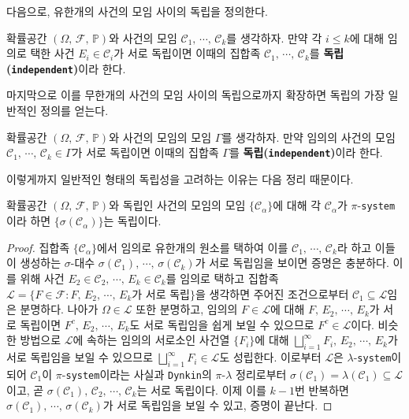 다음으로, 유한개의 사건의 모임 사이의 독립을 정의한다.

\begin{definition}
    확률공간 $(\Omega,\,\mathcal{F},\,\mathbb{P})$와 사건의 모임 $\mathcal{C}_1,\,\cdots,\,\mathcal{C}_k$를 생각하자. 만약 각 $i\leq k$에 대해 임의로 택한 사건 $E_i\in\mathcal{C}_i$가 서로 독립이면 이때의 집합족 $\mathcal{C}_1,\,\cdots,\,\mathcal{C}_k$를 \textbf{독립(\texttt{independent})}이라 한다.
\end{definition}

마지막으로 이를 무한개의 사건의 모임 사이의 독립으로까지 확장하면 독립의 가장 일반적인 정의를 얻는다.

\begin{definition}
    확률공간 $(\Omega,\,\mathcal{F},\,\mathbb{P})$와 사건의 모임의 모임 $\Gamma$를 생각하자. 만약 임의의 사건의 모임 $\mathcal{C}_1,\,\cdots,\,\mathcal{C}_k\in\Gamma$가 서로 독립이면 이때의 집합족 $\Gamma$를 \textbf{독립(\texttt{independent})}이라 한다.
\end{definition}

이렇게까지 일반적인 형태의 독립성을 고려하는 이유는 다음 정리 때문이다.

\begin{theorem}
    확률공간 $(\Omega,\,\mathcal{F},\,\mathbb{P})$와 독립인 사건의 모임의 모임 $\{\mathcal{C}_\alpha\}$에 대해 각 $\mathcal{C}_\alpha$가 $\pi$-\texttt{system}이라 하면 $\{\sigma(\mathcal{C}_\alpha)\}$는 독립이다.
\end{theorem}

\begin{proof}
    집합족 $\{\mathcal{C}_\alpha\}$에서 임의로 유한개의 원소를 택하여 이를 $\mathcal{C}_1,\,\cdots,\,\mathcal{C}_k$라 하고 이들이 생성하는 $\sigma$-대수 $\sigma(\mathcal{C}_1),\,\cdots,\,\sigma(\mathcal{C}_k)$가 서로 독립임을 보이면 증명은 충분하다. 이를 위해 사건 $E_2\in\mathcal{C}_2,\,\cdots,\,E_k\in\mathcal{C}_k$를 임의로 택하고 집합족 $\mathcal{L}=\{F\in\mathcal{F}:F,\,E_2,\,\cdots,\,E_k\textrm{가 서로 독립}\}$을 생각하면 주어진 조건으로부터 $\mathcal{C}_1\subseteq\mathcal{L}$임은 분명하다. 나아가 $\Omega\in\mathcal{L}$ 또한 분명하고, 임의의 $F\in\mathcal{L}$에 대해 $F,\,E_2,\,\cdots,\,E_k$가 서로 독립이면 $F^c,\,E_2,\,\cdots,\,E_k$도 서로 독립임을 쉽게 보일 수 있으므로 $F^c\in\mathcal{L}$이다. 비슷한 방법으로 $\mathcal{L}$에 속하는 임의의 서로소인 사건열 $\{F_i\}$에 대해 $\bigsqcup_{i=1}^\infty F_i,\,E_2,\,\cdots,\,E_k$가 서로 독립임을 보일 수 있으므로 $\bigsqcup_{i=1}^\infty F_i\in\mathcal{L}$도 성립한다. 이로부터 $\mathcal{L}$은 $\lambda$-\texttt{system}이 되어 $\mathcal{C}_1$이 $\pi$-\texttt{system}이라는 사실과 \texttt{Dynkin}의 $\pi$-$\lambda$ 정리로부터 $\sigma(\mathcal{C}_1)=\lambda(\mathcal{C}_1)\subseteq\mathcal{L}$이고, 곧 $\sigma(\mathcal{C}_1),\,\mathcal{C}_2,\,\cdots,\,\mathcal{C}_k$는 서로 독립이다. 이제 이를 $k-1$번 반복하면 $\sigma(\mathcal{C}_1),\,\cdots,\,\sigma(\mathcal{C}_k)$가 서로 독립임을 보일 수 있고, 증명이 끝난다.
\end{proof}

